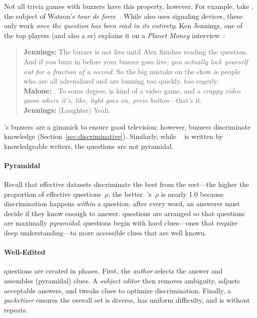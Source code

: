 Not all trivia games with buzzers have this property, however.
For example, take \jeopardy{}, the subject of Watson's \textit{tour de force}~\citep{ferruci-10}.  
While \jeopardy{} also uses signaling devices, these only work \emph{once the question has been read in its entirety}; Ken Jennings, one of the top \jeopardy{} players (and also a \qb{}er) explains it on a \textit{Planet Money} interview~\citep{malone-19}: \clearpage
\begin{quote}
{\bf Jennings:} The buzzer is
    not live until Alex finishes reading the question. And if you buzz
    in before your buzzer goes live, \emph{you actually lock yourself out
    for a fraction of a second}. So the big mistake on the show is
    people who are all adrenalized and are buzzing too quickly, too
    eagerly. \\
{\bf Malone:} . To some degree, \jeopardy{} is kind of a video game, and a \emph{crappy video game where it's, like, light goes on, press button}---that's it. \\
{\bf Jennings:} (Laughter) Yeah. \\
\end{quote}
\jeopardy{}'s buzzers are a gimmick to ensure good television; however, \qb{} buzzers discriminate knowledge (Section~\ref{sec:discriminative}).
Similarly, while \triviaqa{}~\citep{joshi-17} is written by knowledgeable writers, the questions are not pyramidal.

\paragraph{Pyramidal}
\label{sec:pyramidality}

Recall that effective datasets discriminate the best
from the rest---the higher the proportion of effective
questions~$\rho$, the better.
\qb{}'s~$\rho$ is nearly 1.0 because discrimination happens
\emph{within} a question: after every word, an answerer must decide
if they know enough to answer.
\qb{} questions are arranged so that questions are maximally \emph{pyramidal}: questions begin with hard clues---ones that require deep understanding---to more accessible clues that are well known.


\paragraph{Well-Edited}

\qb{} questions are created in phases.
First, the \emph{author} selects the answer and assembles (pyramidal) clues.
A \emph{subject editor} then removes ambiguity, adjusts acceptable answers, and tweaks clues to optimize discrimination.
Finally, a \emph{packetizer} ensures the overall set is diverse, has uniform difficulty, and is without repeats.

